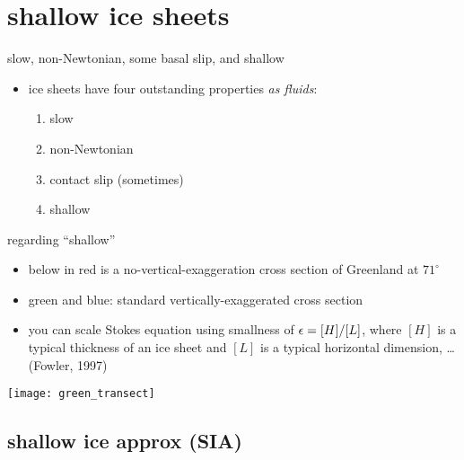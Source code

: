 
\section{shallow ice sheets}

\begin{frame}{slow, non-Newtonian, some basal slip, and shallow}

\begin{itemize}
\item ice sheets have four outstanding properties \emph{as fluids}:
  \begin{enumerate}
  \item slow
  \item non-Newtonian
  \item contact slip (sometimes)
  \item shallow
  \end{enumerate}
\end{itemize}
\end{frame}


\begin{frame}{regarding ``shallow''}

\begin{itemize}
\item below in \alert{red} is a no-vertical-exaggeration cross section of Greenland at $71^\circ$
\small
\item green and blue: standard vertically-exaggerated cross section
\item you can scale Stokes equation using smallness of $\epsilon = [H]/[L]$, where $[H]$ is a typical thickness of an ice sheet and $[L]$ is a typical horizontal dimension, \dots (Fowler, 1997)\nocite{Fowler}
\end{itemize}

\begin{center}
  \texttt{[image: green\_transect]}
\end{center}
\end{frame}


\subsection{shallow ice approx (SIA)}

